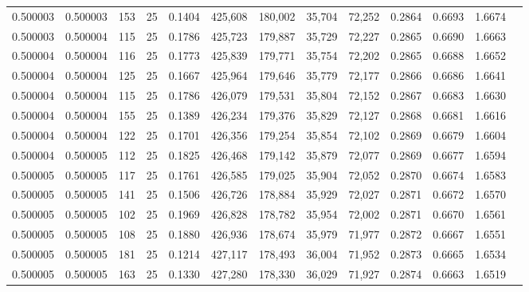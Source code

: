 \begin{tabular}{rrrrrrrrrrrrr}
0.500003 & 0.500003 &   153 &  25 &                                     0.1404 & 425,608 & 180,002 &  35,704 &  72,252 & 0.2864 & 0.6693 & 1.6674 \\
0.500003 & 0.500004 &   115 &  25 &                                     0.1786 & 425,723 & 179,887 &  35,729 &  72,227 & 0.2865 & 0.6690 & 1.6663 \\
0.500004 & 0.500004 &   116 &  25 &                                     0.1773 & 425,839 & 179,771 &  35,754 &  72,202 & 0.2865 & 0.6688 & 1.6652 \\
0.500004 & 0.500004 &   125 &  25 &                                     0.1667 & 425,964 & 179,646 &  35,779 &  72,177 & 0.2866 & 0.6686 & 1.6641 \\
0.500004 & 0.500004 &   115 &  25 &                                     0.1786 & 426,079 & 179,531 &  35,804 &  72,152 & 0.2867 & 0.6683 & 1.6630 \\
0.500004 & 0.500004 &   155 &  25 &                                     0.1389 & 426,234 & 179,376 &  35,829 &  72,127 & 0.2868 & 0.6681 & 1.6616 \\
0.500004 & 0.500004 &   122 &  25 &                                     0.1701 & 426,356 & 179,254 &  35,854 &  72,102 & 0.2869 & 0.6679 & 1.6604 \\
0.500004 & 0.500005 &   112 &  25 &                                     0.1825 & 426,468 & 179,142 &  35,879 &  72,077 & 0.2869 & 0.6677 & 1.6594 \\
0.500005 & 0.500005 &   117 &  25 &                                     0.1761 & 426,585 & 179,025 &  35,904 &  72,052 & 0.2870 & 0.6674 & 1.6583 \\
0.500005 & 0.500005 &   141 &  25 &                                     0.1506 & 426,726 & 178,884 &  35,929 &  72,027 & 0.2871 & 0.6672 & 1.6570 \\
0.500005 & 0.500005 &   102 &  25 &                                     0.1969 & 426,828 & 178,782 &  35,954 &  72,002 & 0.2871 & 0.6670 & 1.6561 \\
0.500005 & 0.500005 &   108 &  25 &                                     0.1880 & 426,936 & 178,674 &  35,979 &  71,977 & 0.2872 & 0.6667 & 1.6551 \\
0.500005 & 0.500005 &   181 &  25 &                                     0.1214 & 427,117 & 178,493 &  36,004 &  71,952 & 0.2873 & 0.6665 & 1.6534 \\
0.500005 & 0.500005 &   163 &  25 &                                     0.1330 & 427,280 & 178,330 &  36,029 &  71,927 & 0.2874 & 0.6663 & 1.6519 \\

\end{tabular}

